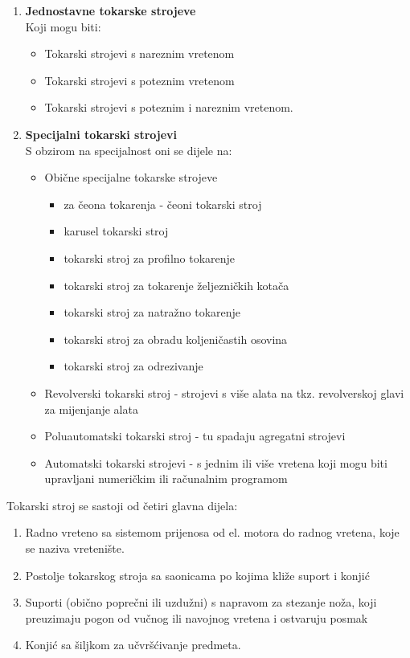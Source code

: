 \documentclass[a4paper,12pt]{article}
\numberwithin{figure}{section}
\begin{document}
\begin{enumerate}
\item \textbf{Jednostavne tokarske strojeve}\\
Koji mogu biti:
\begin{itemize}
\item Tokarski strojevi s nareznim vretenom
\item Tokarski strojevi s poteznim vretenom
\item Tokarski strojevi s poteznim i nareznim vretenom.
\end{itemize}
\item \textbf{Specijalni tokarski strojevi}\\
S obzirom na specijalnost oni se dijele na:
\begin{itemize}
\item Obične specijalne tokarske strojeve
\begin{itemize}
\item za čeona tokarenja - čeoni tokarski stroj
\item karusel tokarski stroj
\item tokarski stroj za profilno tokarenje
\item tokarski stroj za tokarenje željezničkih kotača
\item tokarski stroj za natražno tokarenje
\item tokarski stroj za obradu koljeničastih osovina
\item tokarski stroj za odrezivanje
\end{itemize}
\item Revolverski tokarski stroj - strojevi s više alata na tkz. revolverskoj glavi za mijenjanje alata
\item Poluautomatski tokarski stroj - tu spadaju agregatni strojevi
\item Automatski tokarski strojevi - s jednim ili više vretena koji mogu biti upravljani numeričkim ili računalnim programom
\end{itemize}
\end{enumerate}
Tokarski stroj se sastoji od četiri glavna dijela:
\begin{enumerate}
\item Radno vreteno sa sistemom prijenosa od el. motora do radnog vretena, koje se naziva vretenište.
\item Postolje tokarskog stroja sa saonicama po kojima kliže suport i konjić
\item Suporti (obično poprečni ili uzdužni) s napravom za stezanje noža, koji preuzimaju pogon od vučnog ili navojnog vretena i ostvaruju posmak
\item Konjić sa šiljkom za učvršćivanje predmeta.
\end{enumerate}
\end{document}
